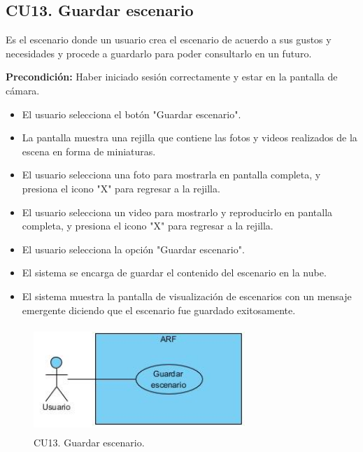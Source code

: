 \subsection{CU13. Guardar escenario}\par
Es el escenario donde un usuario crea el escenario de acuerdo a sus gustos y necesidades y procede a guardarlo para poder consultarlo en un futuro.\par
\textbf{Precondición:} Haber iniciado sesión correctamente y estar en la pantalla de cámara.\par
\begin{itemize}
	\item El usuario selecciona el botón "Guardar escenario".
	\item La pantalla muestra una rejilla que contiene las fotos y videos realizados de la escena en forma de miniaturas.
	\item El usuario selecciona una foto para mostrarla en pantalla completa, y presiona el icono "X" para regresar a la rejilla.
	\item El usuario selecciona un video para mostrarlo y reproducirlo en pantalla completa, y presiona el icono "X" para regresar a la rejilla.
	\item El usuario selecciona la opción "Guardar escenario".
	\item El sistema se encarga de guardar el contenido del escenario en la nube.
	\item El sistema muestra la pantalla de visualización de escenarios con un mensaje emergente diciendo que el escenario fue guardado exitosamente.
\end{itemize}

\begin{figure}[h!]
	\centering
	\includegraphics[width=8cm,height=4cm]{imagenes/analisis/cu/guardar_escenario.jpg}
	\caption{CU13. Guardar escenario.}
	\label{fig:guardarescenario}
\end{figure} 

